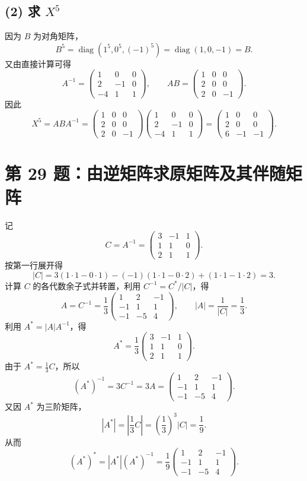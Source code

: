 \documentclass[11pt,a4paper,fontset=fandol]{ctexart}
\newcommand{\ans}[1]{\boxed{#1}}
\newcommand{\problem}[1]{\Needspace{9\baselineskip}\section*{#1}}
\begin{document}
\subsection*{(2) 求 $X^5$}
因为 $B$ 为对角矩阵，
\[
B^5=\operatorname{diag}(1^5,0^5,(-1)^5)
=\operatorname{diag}(1,0,-1)=B.
\]
又由直接计算可得
\[
A^{-1}=\begin{pmatrix}1&0&0\\2&-1&0\\-4&1&1\end{pmatrix},
\qquad
AB=\begin{pmatrix}1&0&0\\2&0&0\\2&0&-1\end{pmatrix}.
\]
因此
\[
\ans{X^5=ABA^{-1}
=\begin{pmatrix}1&0&0\\2&0&0\\2&0&-1\end{pmatrix}
 \begin{pmatrix}1&0&0\\2&-1&0\\-4&1&1\end{pmatrix}
=\begin{pmatrix}1&0&0\\2&0&0\\6&-1&-1\end{pmatrix}}.
\]

\newpage
\problem{第 29 题：由逆矩阵求原矩阵及其伴随矩阵}
记
\[
C=A^{-1}=\begin{pmatrix}3&-1&1\\1&1&0\\2&1&1\end{pmatrix}.
\]
按第一行展开得
\[
|C|=3(1\cdot1-0\cdot1)
-(-1)(1\cdot1-0\cdot2)+(1\cdot1-1\cdot2)=3.
\]
计算 $C$ 的各代数余子式并转置，利用 $C^{-1}=C^*/|C|$，得
\[
\ans{A=C^{-1}=\frac13
\begin{pmatrix}1&2&-1\\-1&1&1\\-1&-5&4\end{pmatrix}},
\qquad |A|=\frac1{|C|}=\frac13.
\]
利用 $A^*=|A|A^{-1}$，得
\[
\ans{A^*=\frac13
\begin{pmatrix}3&-1&1\\1&1&0\\2&1&1\end{pmatrix}}.
\]
由于 $A^*=\frac13 C$，所以
\[
\ans{(A^*)^{-1}=3C^{-1}=3A
=\begin{pmatrix}1&2&-1\\-1&1&1\\-1&-5&4\end{pmatrix}}.
\]
又因 $A^*$ 为三阶矩阵，
\[
|A^*|=\left|\frac13 C\right|
=\left(\frac13\right)^3|C|=\frac19.
\]
从而
\[
\ans{(A^*)^*=|A^*|(A^*)^{-1}
=\frac19\begin{pmatrix}1&2&-1\\-1&1&1\\-1&-5&4\end{pmatrix}}.
\]
\end{document}
